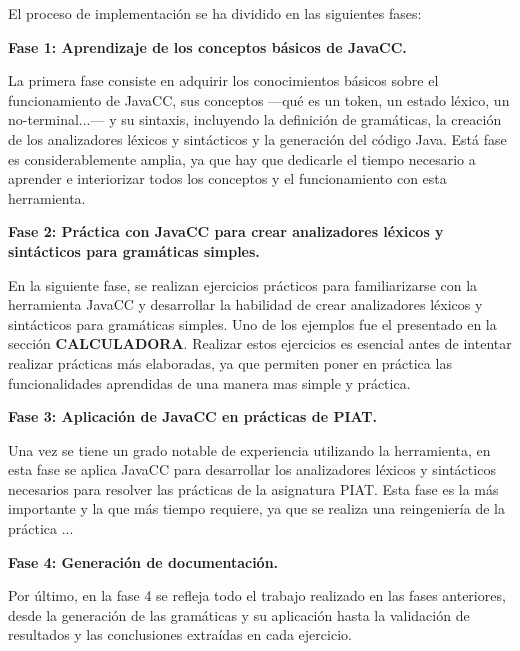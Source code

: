 \noindent El proceso de implementación se ha dividido en las siguientes fases:

\phantom{text}

\noindent \textbf{Fase 1: Aprendizaje de los conceptos básicos de JavaCC.}

\phantom{text}

\noindent La primera fase consiste en adquirir los conocimientos básicos sobre el funcionamiento de JavaCC, sus conceptos ---qué es un token, un estado léxico, un no-terminal...--- y su sintaxis, incluyendo la definición de gramáticas, la creación de los analizadores léxicos y sintácticos y la generación del código Java. Está fase es considerablemente amplia, ya que hay que dedicarle el tiempo necesario a aprender e interiorizar todos los conceptos y el funcionamiento con esta herramienta.

\phantom{text}

\noindent \textbf{Fase 2: Práctica con JavaCC para crear analizadores léxicos y sintácticos para gramáticas simples.}

\phantom{text}
    
\noindent En la siguiente fase, se realizan ejercicios prácticos para familiarizarse con la herramienta JavaCC y desarrollar la habilidad de crear analizadores léxicos y sintácticos para gramáticas simples. Uno de los ejemplos fue el presentado en la sección \textbf{CALCULADORA}. Realizar estos ejercicios es esencial antes de intentar realizar prácticas más elaboradas, ya que permiten poner en práctica las funcionalidades aprendidas de una manera mas simple y práctica.

\phantom{text}

\noindent \textbf{Fase 3: Aplicación de JavaCC en prácticas de PIAT.}

\phantom{text}

\noindent Una vez se tiene un grado notable de experiencia utilizando la herramienta, en esta fase se aplica JavaCC para desarrollar los analizadores léxicos y sintácticos necesarios para resolver las prácticas de la asignatura PIAT. Esta fase es la más importante y la que más tiempo requiere, ya que se realiza una reingeniería de la práctica ... 


\phantom{text}

\noindent \textbf{Fase 4: Generación de documentación.}

\phantom{text}

\noindent Por último, en la fase 4 se refleja todo el trabajo realizado en las fases anteriores, desde la generación de las gramáticas y su aplicación hasta la validación de resultados y las conclusiones extraídas en cada ejercicio.


